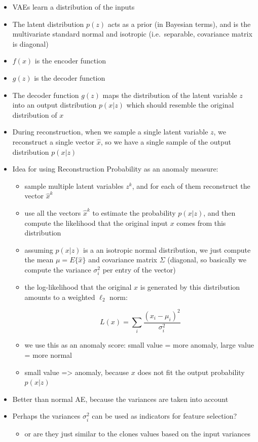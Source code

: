 \documentclass[
  letterpaper,
  DIV=11,
  numbers=noendperiod]{scrartcl}
\providecommand{\tightlist}{%
  \setlength{\itemsep}{0pt}\setlength{\parskip}{0pt}}\usepackage{longtable,booktabs,array}
\begin{document}
\begin{itemize}
\item
  VAEs learn a distribution of the inputs
\item
  The latent distribution \(p(z)\) acts as a prior (in Bayesian terms),
  and is the multivariate standard normal and isotropic (i.e.~separable,
  covariance matrix is diagonal)
\item
  \(f(x)\) is the encoder function
\item
  \(g(z)\) is the decoder function
\item
  The decoder function \(g(z)\) maps the distribution of the latent
  variable \(z\) into an output distribution \(p(x|z)\) which should
  resemble the original distribution of \(x\)
\item
  During reconstruction, when we sample a single latent variable \(z\),
  we reconstruct a single vector \(\hat{x}\), so we have a single sample
  of the output distribution \(p(x|z)\)
\item
  Idea for using Reconstruction Probability as an anomaly measure:

  \begin{itemize}
  \item
    sample multiple latent variables \(z^k\), and for each of them
    reconstruct the vector \(\hat{x}^k\)
  \item
    use all the vectors \(\hat{x}^k\) to estimate the probability
    \(p(x|z)\), and then compute the likelihood that the original input
    \(x\) comes from this distribution
  \item
    assuming \(p(x|z)\) is a an isotropic normal distribution, we just
    compute the mean \(\mu = E \lbrace \hat{x} \rbrace\) and covariance
    matrix \(\Sigma\) (diagonal, so basically we compute the variance
    \(\sigma_i^2\) per entry of the vector)
  \item
    the log-likelihood that the original \(x\) is generated by this
    distribution amounts to a weighted \(\ell_2\) norm:

    \[L(x) = \sum_i \frac{(x_i - \mu_i)^2}{\sigma_i^2}\]
  \item
    we use this as an anomaly score: small value = more anomaly, large
    value = more normal
  \item
    small value =\textgreater{} anomaly, because \(x\) does not fit the
    output probability \(p(x|z)\)
  \end{itemize}
\item
  Better than normal AE, because the variances are taken into account
\item
  Perhaps the variances \(\sigma_i^2\) can be used as indicators for
  feature selection?

  \begin{itemize}
  \tightlist
  \item
    or are they just similar to the clones values based on the input
    variances
  \end{itemize}
\end{itemize}
\end{document}
